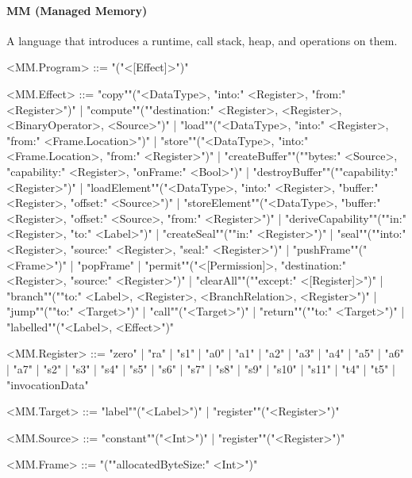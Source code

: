 \documentclass[main.tex]{subfiles}
\begin{document}
\paragraph{ MM (Managed Memory) } A language that introduces a runtime, call stack, heap, and operations on them.
\begin{grammar}
	\footnotesize
				<MM.Program> ::=
							"("<[Effect]>")"
				\par
				<MM.Effect> ::=
						"copy""("<DataType>, "into:" <Register>, "from:" <Register>")"
						| "compute""(""destination:" <Register>, <Register>, <BinaryOperator>, <Source>")"
						| "load""("<DataType>, "into:" <Register>, "from:" <Frame.Location>")"
						| "store""("<DataType>, "into:" <Frame.Location>, "from:" <Register>")"
						| "createBuffer""(""bytes:" <Source>, "capability:" <Register>, "onFrame:" <Bool>")"
						| "destroyBuffer""(""capability:" <Register>")"
						| "loadElement""("<DataType>, "into:" <Register>, "buffer:" <Register>, "offset:" <Source>")"
						| "storeElement""("<DataType>, "buffer:" <Register>, "offset:" <Source>, "from:" <Register>")"
						| "deriveCapability""(""in:" <Register>, "to:" <Label>")"
						| "createSeal""(""in:" <Register>")"
						| "seal""(""into:" <Register>, "source:" <Register>, "seal:" <Register>")"
						| "pushFrame""("<Frame>")"
						| "popFrame"
						| "permit""("<[Permission]>, "destination:" <Register>, "source:" <Register>")"
						| "clearAll""(""except:" <[Register]>")"
						| "branch""(""to:" <Label>, <Register>, <BranchRelation>, <Register>")"
						| "jump""(""to:" <Target>")"
						| "call""("<Target>")"
						| "return""(""to:" <Target>")"
						| "labelled""("<Label>, <Effect>")"
				\par
				<MM.Register> ::=
						"zero"
						| "ra"
						| "s1"
						| "a0"
						| "a1"
						| "a2"
						| "a3"
						| "a4"
						| "a5"
						| "a6"
						| "a7"
						| "s2"
						| "s3"
						| "s4"
						| "s5"
						| "s6"
						| "s7"
						| "s8"
						| "s9"
						| "s10"
						| "s11"
						| "t4"
						| "t5"
						| "invocationData"
				\par
				<MM.Target> ::=
						"label""("<Label>")"
						| "register""("<Register>")"
				\par
				<MM.Source> ::=
						"constant""("<Int>")"
						| "register""("<Register>")"
				\par
				<MM.Frame> ::=
							"(""allocatedByteSize:" <Int>")"
				\par
\end{grammar}
\par
\end{document}

